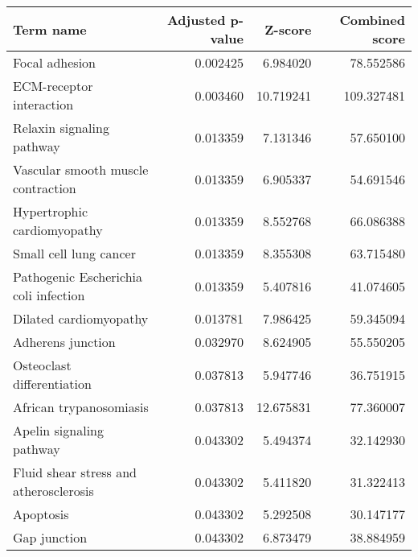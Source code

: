 \begin{tabular}{lrrr}
\toprule
                             Term name &  Adjusted p-value &   Z-score &  Combined score \\
\midrule
                        Focal adhesion &          0.002425 &  6.984020 &       78.552586 \\
              ECM-receptor interaction &          0.003460 & 10.719241 &      109.327481 \\
             Relaxin signaling pathway &          0.013359 &  7.131346 &       57.650100 \\
    Vascular smooth muscle contraction &          0.013359 &  6.905337 &       54.691546 \\
           Hypertrophic cardiomyopathy &          0.013359 &  8.552768 &       66.086388 \\
                Small cell lung cancer &          0.013359 &  8.355308 &       63.715480 \\
 Pathogenic Escherichia coli infection &          0.013359 &  5.407816 &       41.074605 \\
                Dilated cardiomyopathy &          0.013781 &  7.986425 &       59.345094 \\
                     Adherens junction &          0.032970 &  8.624905 &       55.550205 \\
            Osteoclast differentiation &          0.037813 &  5.947746 &       36.751915 \\
               African trypanosomiasis &          0.037813 & 12.675831 &       77.360007 \\
              Apelin signaling pathway &          0.043302 &  5.494374 &       32.142930 \\
Fluid shear stress and atherosclerosis &          0.043302 &  5.411820 &       31.322413 \\
                             Apoptosis &          0.043302 &  5.292508 &       30.147177 \\
                          Gap junction &          0.043302 &  6.873479 &       38.884959 \\
\bottomrule
\end{tabular}
